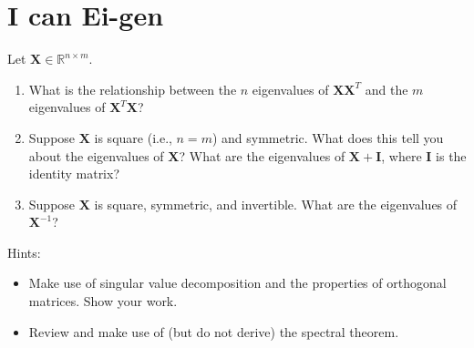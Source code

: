 \documentclass[submit]{harvardml}
\newcommand{\R}{\mathbb{R}}
\renewcommand{\v}[1]{\mathbf{#1}}
\begin{document}
\newpage
\section*{I can Ei-gen}
\begin{problem}
    Let $\v X \in \R^{n \times m}$.
    \begin{enumerate}[label=(\alph*)]
        \item What is the relationship between the $n$ eigenvalues
              of $\v X \v X^T$ and the $m$ eigenvalues of $\v X^T \v X$?
        \item Suppose $\v X$ is square (i.e., $n=m$) and symmetric.
              What does this tell you about the eigenvalues of $\v X$?
              What are the eigenvalues of $\v X + \v I$, where $\v I$ is the identity matrix?
        \item Suppose $\v X$ is square, symmetric, and invertible.
			  What are the eigenvalues of $\v X^{-1}$?
	\end{enumerate}
	Hints:
	\begin{itemize}
		\item Make use of singular value decomposition and the properties
			  of orthogonal matrices. Show your work.
		\item Review and make use of (but do not derive) the spectral theorem.
	\end{itemize}
\end{problem}
\end{document}
